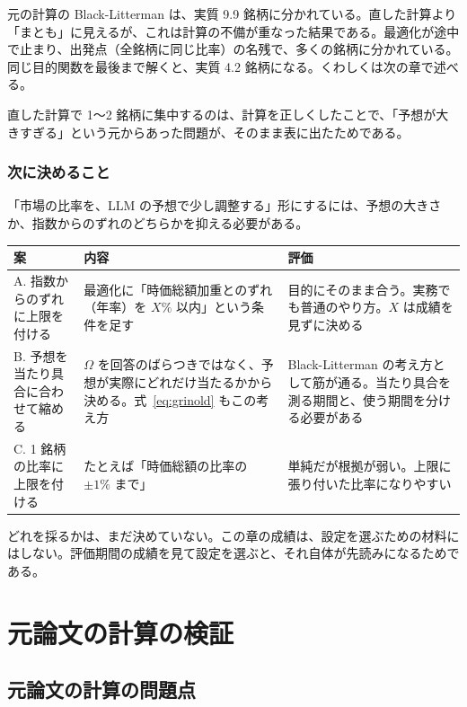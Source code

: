 \documentclass[xelatex,ja=standard,jafont=hiragino-pron,a4paper,10pt]{bxjsreport}
\begin{document}
元の計算の Black-Litterman は、実質 9.9 銘柄に分かれている。直した計算より「まとも」に見えるが、これは計算の不備が重なった結果である。最適化が途中で止まり、出発点（全銘柄に同じ比率）の名残で、多くの銘柄に分かれている。同じ目的関数を最後まで解くと、実質 4.2 銘柄になる。くわしくは次の章で述べる。

直した計算で 1〜2 銘柄に集中するのは、計算を正しくしたことで、「予想が大きすぎる」という元からあった問題が、そのまま表に出たためである。

\section{次に決めること}

「市場の比率を、LLM の予想で少し調整する」形にするには、予想の大きさか、指数からのずれのどちらかを抑える必要がある。

\begin{longtable}{p{3.80cm}p{5.40cm}p{5.20cm}}
\toprule
\textbf{案} & \textbf{内容} & \textbf{評価} \\
\midrule
\endfirsthead
\bottomrule
\endfoot
A. 指数からのずれに上限を付ける & 最適化に「時価総額加重とのずれ（年率）を $X\%$ 以内」という条件を足す & 目的にそのまま合う。実務でも普通のやり方。$X$ は成績を見ずに決める \\
B. 予想を当たり具合に合わせて縮める & $\Omega$ を回答のばらつきではなく、予想が実際にどれだけ当たるかから決める。式~\eqref{eq:grinold} もこの考え方 & Black-Litterman の考え方として筋が通る。当たり具合を測る期間と、使う期間を分ける必要がある \\
C. 1 銘柄の比率に上限を付ける & たとえば「時価総額の比率の $\pm 1\%$ まで」 & 単純だが根拠が弱い。上限に張り付いた比率になりやすい \\
\end{longtable}

どれを採るかは、まだ決めていない。この章の成績は、設定を選ぶための材料にはしない。評価期間の成績を見て設定を選ぶと、それ自体が先読みになるためである。

\part{元論文の計算の検証}

\chapter{元論文の計算の問題点}\label{ch:problems}
\end{document}
